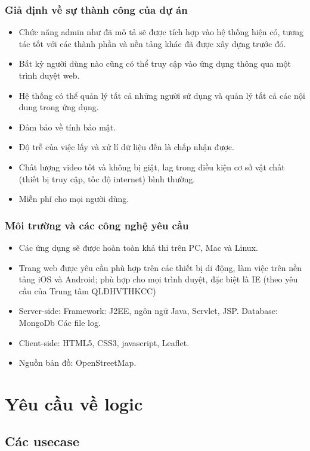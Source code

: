\subsubsection{Giả định về sự thành công của dự án}
\begin{itemize}
	\item Chức năng admin như đã mô tả sẽ được tích hợp vào hệ thống hiện có, tương tác tốt với các thành phần và nền tảng khác đã được xây dựng trước đó.
	\item Bất kỳ người dùng nào cũng có thể truy cập vào ứng dụng thông qua một trình duyệt web.
	\item Hệ thống có thể quản lý tất cả những người sử dụng và quản lý tất cả các nội dung trong ứng dụng.
	\item Đảm bảo về tính bảo mật.
	\item Độ trễ của việc lấy và xử lí dữ liệu đến là chấp nhận được.
	\item Chất lượng video tốt và không bị giật, lag trong điều kiện cơ sở vật chất (thiết bị truy cập, tốc độ internet) bình thường.
	\item Miễn phí cho mọi người dùng.
\end{itemize}

\subsubsection{Môi trường và các công nghệ yêu cầu}
\begin{itemize}
	\item Các ứng dụng sẽ được hoàn toàn khả thi trên PC, Mac và Linux. 
	\item Trang web được yêu cầu phù hợp trên các thiết bị di động, làm việc trên nền tảng iOS và Android; phù hợp cho mọi trình duyệt, đặc biệt là IE (theo yêu cầu của Trung tâm QLĐHVTHKCC)
	\item Server-side: 
	\subitem Framework: J2EE, ngôn ngữ Java, Servlet, JSP.
	\subitem Database:
		\subsubitem MongoDb
		\subsubitem Các file log.
	\item Client-side: HTML5, CSS3, javascript, Leaflet.
	\item Nguồn bản đồ: OpenStreetMap.
\end{itemize}

\section{Yêu cầu về logic}

\subsection{Các usecase}

